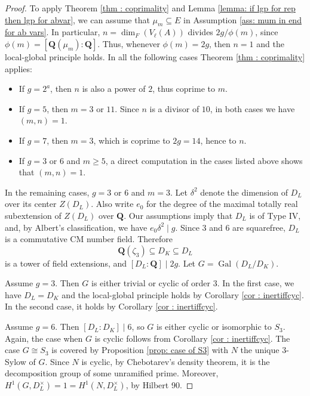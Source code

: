 \documentclass[a4paper,10pt]{amsart}
\theoremstyle{plain}
\theoremstyle{definition}
\theoremstyle{remark}
\def\Q{\mathbf Q}
\newcommand{\bD}{D_L}
\DeclareMathOperator{\Gal}{Gal}
\begin{document}
\begin{proof}
To apply Theorem \ref{thm : coprimality} and Lemma \ref{lemma: if lgp for rep then lgp for abvar}, we can assume that \(\mu_m \subseteq E\) in Assumption \ref{ass: mum in end for ab vars}. In particular, \(n = \dim_F(V_\ell(A))\) divides \({2g}/\phi(m)\), since \(\phi(m) = [\Q(\mu_m) \colon \Q]\). Thus, whenever \(\phi(m)  = 2g\), then \(n = 1\) and the local-global principle holds. In all the following cases Theorem \ref{thm : coprimality} applies:
\begin{itemize}
    \item If \(g=2^a\), then \(n\) is also a power of \(2\), thus coprime to \(m\).
    \item If \(g=5\), then \(m=3\) or \(11\). Since \(n\) is a divisor of \(10\), in both cases we have \((m,n)=1\).
    \item If \(g=7\), then \(m=3\), which is coprime to \(2g=14\), hence to \(n\).
    \item If \(g=3\) or \(6\) and \(m \ge 5\), a direct computation in the cases listed above shows that \((m, n)=1\).
\end{itemize}
In the remaining cases, \(g = 3\) or \(6\) and \(m = 3\). Let \(\delta^2\) denote the dimension of \(\bD\) over its center \(Z(\bD)\). Also write \(e_0\) for the degree of the maximal totally real subextension of \(Z(\bD)\) over \(\Q\).
Our assumptions imply that \(\bD\) is of Type IV, and, by Albert's classification, we have \(e_0 \delta^2 \mid g\). Since \(3\) and \(6\) are squarefree, \(\bD\) is a commutative CM number field. Therefore
\[
\Q(\zeta_3) \subseteq D_K \subseteq \bD
\]
is a tower of field extensions, and \([\bD : \Q] \mid 2g\). Let \(G=\Gal(\bD/D_K)\).

Assume \(g=3\). Then \(G\) is either trivial or cyclic of order \(3\). In the first case, we have \(\bD=D_K\) and the local-global principle holds by Corollary \ref{cor : inertiffcyc}. In the second case, it holds by Corollary \ref{cor : inertiffcyc}.

Assume \(g=6\). Then \([D_L : D_K] \mid 6\), so \(G\) is either cyclic or isomorphic to \(S_3\). Again, the case when \(G\) is cyclic follows from Corollary \ref{cor : inertiffcyc}. The case \(G \cong S_3\) is covered by Proposition \ref{prop: case of S3} with \(N\) the unique \(3\)-Sylow of \(G\). Since \(N\) is cyclic, by Chebotarev's density theorem, it is the decomposition group of some unramified prime. Moreover, \(H^1(G, \bD^\times) = 1 = H^1(N, \bD^\times)\), by Hilbert 90.
\end{proof}




\end{document}
